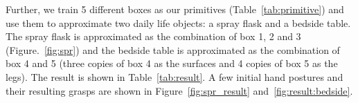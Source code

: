 Further, we train 5 different boxes as our primitives (Table~\ref{tab:primitive}) and use them to approximate two daily life objects: a spray flask and a bedside table. The spray flask is approximated as the combination of box 1, 2 and 3 (Figure.~\ref{fig:spr}) and the bedside table is approximated as the combination of box 4 and 5 (three copies of box 4 as the surfaces and 4 copies of box 5 as the legs). The result is shown in Table~\ref{tab:result}. A few initial hand postures and their resulting grasps are shown in Figure~\ref{fig:spr_result} and~\ref{fig:result:bedside}.

\begin{figure}[!ht]
\centering


\end{figure}
